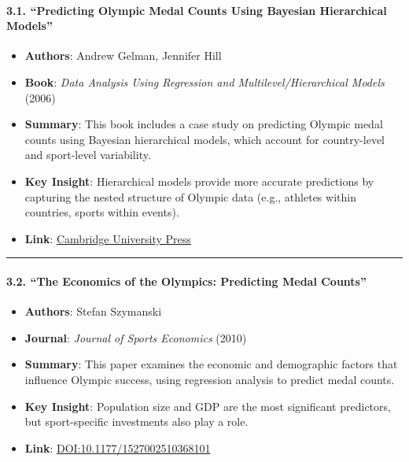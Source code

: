 \begin{enumerate}
\begin{description}
\hypertarget{predicting-olympic-medal-counts-using-bayesian-hierarchical-models}{%
\paragraph{\texorpdfstring{\textbf{3.1. ``Predicting Olympic Medal
Counts Using Bayesian Hierarchical
Models''}}{3.1. ``Predicting Olympic Medal Counts Using Bayesian Hierarchical Models''}}\label{predicting-olympic-medal-counts-using-bayesian-hierarchical-models}}

\begin{itemize}
\item
  \textbf{Authors}: Andrew Gelman, Jennifer Hill
\item
  \textbf{Book}: \emph{Data Analysis Using Regression and
  Multilevel/Hierarchical Models} (2006)
\item
  \textbf{Summary}: This book includes a case study on predicting
  Olympic medal counts using Bayesian hierarchical models, which account
  for country-level and sport-level variability.
\item
  \textbf{Key Insight}: Hierarchical models provide more accurate
  predictions by capturing the nested structure of Olympic data (e.g.,
  athletes within countries, sports within events).
\item
  \textbf{Link}:
  \href{https://www.cambridge.org/9780521686891}{Cambridge University
  Press}
\end{itemize}

\begin{center}\rule{0.5\linewidth}{0.5pt}\end{center}

\hypertarget{the-economics-of-the-olympics-predicting-medal-counts}{%
\paragraph{\texorpdfstring{\textbf{3.2. ``The Economics of the Olympics:
Predicting Medal
Counts''}}{3.2. ``The Economics of the Olympics: Predicting Medal Counts''}}\label{the-economics-of-the-olympics-predicting-medal-counts}}

\begin{itemize}
\item
  \textbf{Authors}: Stefan Szymanski
\item
  \textbf{Journal}: \emph{Journal of Sports Economics} (2010)
\item
  \textbf{Summary}: This paper examines the economic and demographic
  factors that influence Olympic success, using regression analysis to
  predict medal counts.
\item
  \textbf{Key Insight}: Population size and GDP are the most significant
  predictors, but sport-specific investments also play a role.
\item
  \textbf{Link}:
  \href{https://doi.org/10.1177/1527002510368101}{DOI:10.1177/1527002510368101}
\end{itemize}


\end{description}
\end{enumerate}

